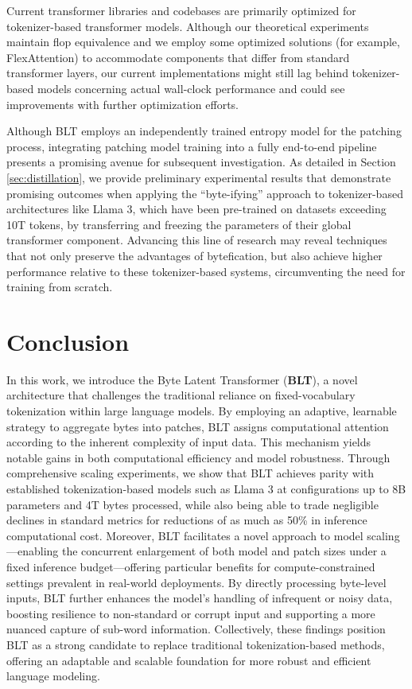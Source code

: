 Current transformer libraries and codebases are primarily optimized for tokenizer-based transformer models. Although our theoretical experiments maintain flop equivalence and we employ some optimized solutions (for example, FlexAttention) to accommodate components that differ from standard transformer layers, our current implementations might still lag behind tokenizer-based models concerning actual wall-clock performance and could see improvements with further optimization efforts.

Although {\textsc BLT} employs an independently trained entropy model for the patching process, integrating patching model training into a fully end-to-end pipeline presents a promising avenue for subsequent investigation. As detailed in Section \ref{sec:distillation}, we provide preliminary experimental results that demonstrate promising outcomes when applying the ``byte-ifying'' approach to tokenizer-based architectures like Llama 3, which have been pre-trained on datasets exceeding 10T tokens, by transferring and freezing the parameters of their global transformer component. Advancing this line of research may reveal techniques that not only preserve the advantages of bytefication, but also achieve higher performance relative to these tokenizer-based systems, circumventing the need for training from scratch.

\section{Conclusion}
\label{section:conclusion}

In this work, we introduce the Byte Latent Transformer (\textbf{BLT}), a novel architecture that challenges the traditional reliance on fixed-vocabulary tokenization within large language models. By employing an adaptive, learnable strategy to aggregate bytes into patches, {\textsc BLT} assigns computational attention according to the inherent complexity of input data. This mechanism yields notable gains in both computational efficiency and model robustness. Through comprehensive scaling experiments, we show that {\textsc BLT} achieves parity with established tokenization-based models such as Llama 3 at configurations up to 8B parameters and 4T bytes processed, while also being able to trade negligible declines in standard metrics for reductions of as much as 50\% in inference computational cost. Moreover, {\textsc BLT} facilitates a novel approach to model scaling—enabling the concurrent enlargement of both model and patch sizes under a fixed inference budget—offering particular benefits for compute-constrained settings prevalent in real-world deployments. By directly processing byte-level inputs, {\textsc BLT} further enhances the model's handling of infrequent or noisy data, boosting resilience to non-standard or corrupt input and supporting a more nuanced capture of sub-word information. Collectively, these findings position {\textsc BLT} as a strong candidate to replace traditional tokenization-based methods, offering an adaptable and scalable foundation for more robust and efficient language modeling.

